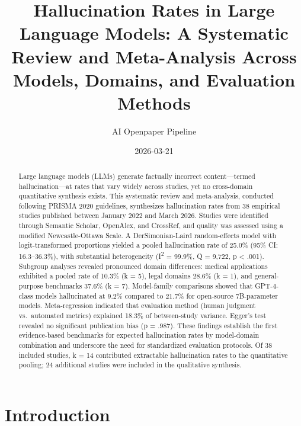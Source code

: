 \documentclass[
  11pt,
  a4paper,
]{article}
\title{Hallucination Rates in Large Language Models: A Systematic Review
and Meta-Analysis Across Models, Domains, and Evaluation Methods}
\author{AI Openpaper Pipeline}
\date{2026-03-21}
\begin{document}
\maketitle
\begin{abstract}
Large language models (LLMs) generate factually incorrect
content---termed hallucination---at rates that vary widely across
studies, yet no cross-domain quantitative synthesis exists. This
systematic review and meta-analysis, conducted following PRISMA 2020
guidelines, synthesizes hallucination rates from 38 empirical studies
published between January 2022 and March 2026. Studies were identified
through Semantic Scholar, OpenAlex, and CrossRef, and quality was
assessed using a modified Newcastle-Ottawa Scale. A DerSimonian-Laird
random-effects model with logit-transformed proportions yielded a pooled
hallucination rate of 25.0\% (95\% CI: 16.3--36.3\%), with substantial
heterogeneity (I\textsuperscript{2} = 99.9\%, Q = 9,722, p \textless{}
.001). Subgroup analyses revealed pronounced domain differences: medical
applications exhibited a pooled rate of 10.3\% (k = 5), legal domains
28.6\% (k = 1), and general-purpose benchmarks 37.6\% (k = 7).
Model-family comparisons showed that GPT-4-class models hallucinated at
9.2\% compared to 21.7\% for open-source 7B-parameter models.
Meta-regression indicated that evaluation method (human judgment
vs.~automated metrics) explained 18.3\% of between-study variance.
Egger's test revealed no significant publication bias (p = .987). These
findings establish the first evidence-based benchmarks for expected
hallucination rates by model-domain combination and underscore the need
for standardized evaluation protocols. Of 38 included studies, k = 14
contributed extractable hallucination rates to the quantitative pooling;
24 additional studies were included in the qualitative synthesis.
\end{abstract}


\section{Introduction}\label{introduction}
\end{document}

